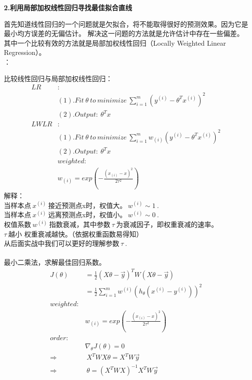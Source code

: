 \noindent\textbf{2.利用局部加权线性回归寻找最佳拟合直线}\par
首先知道线性回归的一个问题就是欠拟合，将不能取得很好的预测效果。因为它是最小均方误差的无偏估计。
解决这一问题的方法就是允许估计中存在一些偏差。其中一个比较有效的方法就是局部加权线性回归（Locally Weighted Linear Regression）。\\
：\par
比较线性回归与局部加权线性回归：
\begin{equation}\nonumber
\begin{split}
LR&:\\
   &(1).Fit~\theta~to~minimize~\sum_{i=1}^{m}(y^{(i)}-\theta^Tx^{(i)})^2\\
   &(2).Output:~\theta^Tx\\
LWLR&:\\
   &(1).Fit~\theta~to~minimize~\sum_{i=1}^{m}w_{(i)}(y^{(i)}-\theta^Tx^{(i)})^2\\
   &(2).Output:~\theta^Tx\\
   &weighted:\\
   &w_{(i)}=exp(-\frac{(x_{(i)}-x)^2}{2\tau^2})
\end{split}
\end{equation}
解释：\\
当样本点$~x^{(i)}~$接近预测点x时，权值大。$~w^{(i)}\sim1~$.\\
当样本点$~x^{(i)}~$远离预测点x时，权值小。$~w^{(i)}\sim0~$.\\
权值系数$~w^{(i)}~$指数衰减，其中参数$~\tau~$为衰减因子，即权重衰减的速率。\\
$\tau~$越小 权重衰减越快。（依据权重函数易得知）\\
从后面实战中我们可以更好的理解参数$~\tau~.$ \\
\\
最小二乘法，求解最佳回归系数。
\begin{equation}\nonumber
\begin{split}
 J(\theta)&=\frac{1}{2}(X\theta-\vec{y})^TW(X\theta-\vec{y})\\
         &=\frac{1}{2}\sum_{i=1}^{m}w^{(i)}(h_\theta(x^{(i)}-y^{(i)}))^2\\
   weighted:&\\
   &w_{(i)}=exp(-\frac{(x_{(i)}-x)^2}{2\tau^2})\\
   order:&\\
   &\nabla_\theta J(\theta)=0\\
   \Rightarrow&~X^TWX\theta=X^TW\vec{y}\\
   \Rightarrow&~\theta=(X^TWX)^{-1}X^TW\vec{y}\\
\end{split}
\end{equation}

